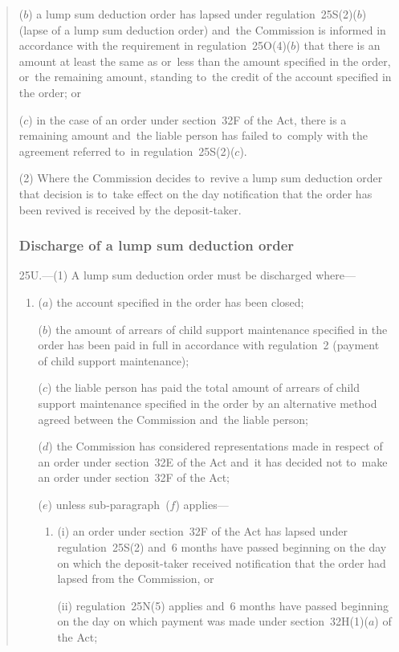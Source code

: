 \documentclass[12pt,a4paper]{article}
\begin{document}
\begin{quotation}
\begin{enumerate}
($b$) a lump sum deduction order has lapsed under regulation~25S(2)($b$)  (lapse of a lump sum deduction order) and~the Commission is informed in accordance with the requirement in regulation~25O(4)($b$)  that there is an amount at least the same as or~less than the amount specified in the order, or~the remaining amount, standing to~the credit of the account specified in the order; or

($c$) in the case of an order under section~32F of the Act, there is a remaining amount and~the liable person has failed to~comply with the agreement referred to~in regulation~25S(2)($c$).
\end{enumerate}

(2) Where the Commission decides to~revive a lump sum deduction order that decision is to~take effect on the day notification that the order has been revived is received by the deposit-taker.

\subsubsection*{Discharge of a lump sum deduction order}

25U.---(1)  A lump sum deduction order must be discharged where—
\begin{enumerate}\item[]
($a$) the account specified in the order has been closed;

($b$) the amount of arrears of child support maintenance specified in the order has been paid in full in accordance with regulation~2 (payment of child support maintenance);

($c$) the liable person has paid the total amount of arrears of child support maintenance specified in the order by an alternative method agreed between the Commission and~the liable person;

($d$) the Commission has considered representations made in respect of an order under section~32E of the Act and~it has decided not to~make an order under section~32F of the Act;

($e$) unless sub-paragraph~($f$)  applies—
\begin{enumerate}\item[]
(i) an order under section~32F of the Act has lapsed under regulation~25S(2) and~6 months have passed beginning on the day on which the deposit-taker received notification that the order had lapsed from the Commission, or

(ii) regulation~25N(5) applies and~6 months have passed beginning on the day on which payment was made under section~32H(1)($a$)  of the Act;
\end{enumerate}


\end{enumerate}
\end{quotation}
\end{document}
